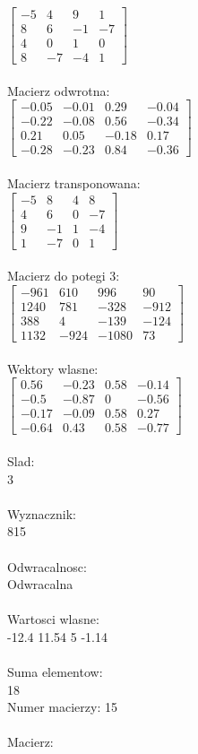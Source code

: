\documentclass[a4paper,12pt]{article}
\begin{document}
$\begin{bmatrix} -5&4&9&1\\8&6&-1&-7\\4&0&1&0\\8&-7&-4&1 \end{bmatrix}$
\\
\\
Macierz odwrotna:\\

$\begin{bmatrix} -0.05&-0.01&0.29&-0.04\\-0.22&-0.08&0.56&-0.34\\0.21&0.05&-0.18&0.17\\-0.28&-0.23&0.84&-0.36 \end{bmatrix}$
\\
\\
Macierz transponowana:\\

$\begin{bmatrix} -5&8&4&8\\4&6&0&-7\\9&-1&1&-4\\1&-7&0&1 \end{bmatrix}$
\\
\\
Macierz do potegi 3:\\

$\begin{bmatrix} -961&610&996&90\\1240&781&-328&-912\\388&4&-139&-124\\1132&-924&-1080&73 \end{bmatrix}$
\\
\\
Wektory wlasne:\\

$\begin{bmatrix} 0.56&-0.23&0.58&-0.14\\-0.5&-0.87&0&-0.56\\-0.17&-0.09&0.58&0.27\\-0.64&0.43&0.58&-0.77 \end{bmatrix}$
\\
\\
Slad:\\
3
\\
\\
Wyznacznik:\\
815
\\
\\
Odwracalnosc:\\
Odwracalna
\\
\\
Wartosci wlasne:\\
-12.4 11.54 5 -1.14
\\
\\
Suma elementow:\\
18
\\
\newpage
Numer macierzy:
15
\\
\\
Macierz:\\
\end{document}

